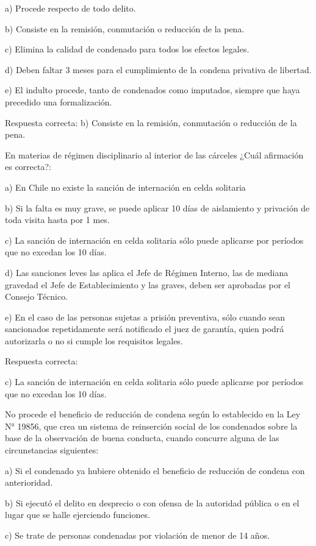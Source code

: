 \documentclass[letterpaper, 11pt]{article}
\begin{document}
a) Procede respecto de todo delito.

b) Consiste en la remisión, conmutación o reducción de la pena.

c) Elimina la calidad de condenado para todos los efectos legales.

d) Deben faltar 3 meses para el cumplimiento de la condena privativa de libertad.

e) El indulto procede, tanto de condenados como imputados, siempre que haya
precedido una formalización.

Respuesta correcta:
b) Consiste en la remisión, conmutación o reducción de la pena.


En materias de régimen disciplinario al interior de las cárceles ¿Cuál afirmación es
correcta?:

a) En Chile no existe la sanción de internación en celda solitaria

b) Si la falta es muy grave, se puede aplicar 10 días de aislamiento y privación de toda
visita hasta por 1 mes.

c) La sanción de internación en celda solitaria sólo puede aplicarse por períodos que
no excedan los 10 días.

d) Las sanciones leves las aplica el Jefe de Régimen Interno, las de mediana gravedad
el Jefe de Establecimiento y las graves, deben ser aprobadas por el Consejo
Técnico.

e) En el caso de las personas sujetas a prisión preventiva, sólo cuando sean
sancionados repetidamente será notificado el juez de garantía, quien podrá
autorizarla o no si cumple los requisitos legales.

Respuesta correcta:

c) La sanción de internación en celda solitaria sólo puede
aplicarse por períodos que no excedan los 10 días.

No procede el beneficio de reducción de condena según lo establecido en la Ley N°
19856, que crea un sistema de reinserción social de los condenados sobre la base de la
observación de buena conducta, cuando concurre alguna de las circunstancias siguientes:

a) Si el condenado ya hubiere obtenido el beneficio de reducción de condena con
anterioridad.

b) Si ejecutó el delito en desprecio o con ofensa de la autoridad pública o en el lugar que
se halle ejerciendo funciones.

c) Se trate de personas condenadas por violación de menor de 14 años.
\end{document}
